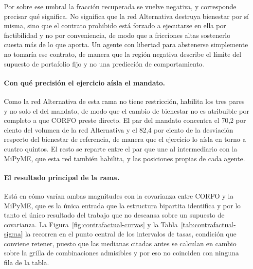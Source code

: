 Por sobre ese umbral la fracción recuperada se vuelve negativa, y corresponde precisar qué significa. No significa que la red Alternativa destruya bienestar por sí misma, sino que el contrato prohibido está forzado a ejecutarse en ella por factibilidad y no por conveniencia, de modo que a fricciones altas sostenerlo cuesta más de lo que aporta. Un agente con libertad para abstenerse simplemente no tomaría ese contrato, de manera que la región negativa describe el límite del supuesto de portafolio fijo y no una predicción de comportamiento.

\paragraph{Con qué precisión el ejercicio aísla el mandato.} Como la red Alternativa de esta rama no tiene restricción, habilita los tres pares y no solo el del mandato, de modo que el cambio de bienestar no es atribuible por completo a que CORFO preste directo. El par del mandato concentra el 70,2 por ciento del volumen de la red Alternativa y el 82,4 por ciento de la desviación respecto del bienestar de referencia, de manera que el ejercicio lo aísla en torno a cuatro quintos. El resto se reparte entre el par que une al intermediario con la MiPyME, que esta red también habilita, y las posiciones propias de cada agente.

\paragraph{El resultado principal de la rama.} Está en cómo varían ambas magnitudes con la covarianza entre CORFO y la MiPyME, que es la única entrada que la estructura bipartita identifica y por lo tanto el único resultado del trabajo que no descansa sobre un supuesto de covarianza. La Figura~\ref{fig:contrafactual-curvas} y la Tabla~\ref{tab:contrafactual-sigma} la recorren en el punto central de los intervalos de tasas, condición que conviene retener, puesto que las medianas citadas antes se calculan en cambio sobre la grilla de combinaciones admisibles y por eso no coinciden con ninguna fila de la tabla.



